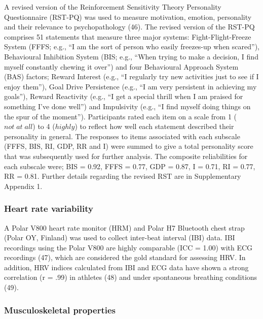 \documentclass[
  english,
  man]{apa6}
\begin{document}
A revised version of the Reinforcement Sensitivity Theory Personality Questionnaire (RST-PQ) was used to measure motivation, emotion, personality and their relevance to psychopathology (46).
The revised version of the RST-PQ comprises 51 statements that measure three major systems: Fight-Flight-Freeze System (FFFS; e.g., ``I am the sort of person who easily freezes-up when scared''), Behavioural Inhibition System (BIS; e.g., ``When trying to make a decision, I find myself constantly chewing it over'') and four Behavioural Approach System (BAS) factors; Reward Interest (e.g., ``I regularly try new activities just to see if I enjoy them''), Goal Drive Persistence (e.g., ``I am very persistent in achieving my goals''), Reward Reactivity (e.g., ``I get a special thrill when I am praised for something I've done well'') and Impulsivity (e.g., ``I find myself doing things on the spur of the moment'').
Participants rated each item on a scale from 1 (\(not\; at\; all\)) to 4 (\(highly\)) to reflect how well each statement described their personality in general.
The responses to items associated with each subscale (FFFS, BIS, RI, GDP, RR and I) were summed to give a total personality score that was subsequently used for further analysis.
The composite reliabilities for each subscale were; BIS = 0.92, FFFS = 0.77, GDP = 0.87, I = 0.71, RI = 0.77, RR = 0.81. Further details regarding the revised RST are in Supplementary Appendix 1.

\hypertarget{heart-rate-variability}{%
\subsubsection{Heart rate variability}\label{heart-rate-variability}}

A Polar V800 heart rate monitor (HRM) and Polar H7 Bluetooth chest strap (Polar OY, Finland) was used to collect inter-beat interval (IBI) data.
IBI recordings using the Polar V800 are highly comparable (ICC = 1.00) with ECG recordings (47), which are considered the gold standard for assessing HRV.
In addition, HRV indices calculated from IBI and ECG data have shown a strong correlation (r = .99) in athletes (48) and under spontaneous breathing conditions (49).

\hypertarget{musculoskeletal-properties}{%
\subsubsection{Musculoskeletal properties}\label{musculoskeletal-properties}}
\end{document}
